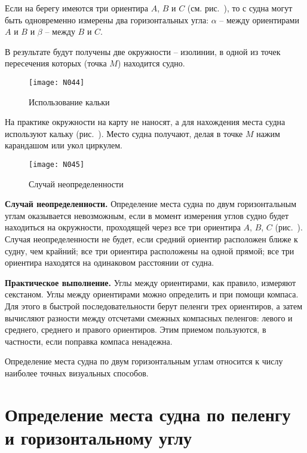 Если на берегу имеются три ориентира $A$, $B$ и $C$
(см. рис.~), то с судна могут быть одновременно измерены два
горизонтальных угла: $\alpha$ \--- между ориентирами $A$ и $B$ и
$\beta$ \--- между $B$ и $C$.

В результате будут получены две окружности \--- изолинии, в одной из
точек пересечения которых (точка $M$) находится судно.

\begin{figure}
  \centering{}
  \texttt{[image: N044]}
  \caption{Использование кальки}
  \label{fig:N44}
\end{figure}

На практике окружности на карту не наносят, а для нахождения места
судна используют кальку (рис.~). Место судна получают, делая
в точке $M$ нажим карандашом или укол циркулем.

\begin{figure}
  \centering{}
  \texttt{[image: N045]}
  \caption{Случай неопределенности}
  \label{fig:N45}
\end{figure}

\textbf{Случай неопределенности.} Определение места судна по двум
горизонтальным углам оказывается невозможным, если в момент измерения
углов судно будет находиться на окружности, проходящей через все три
ориентира $A$, $B$, $C$ (рис.~). Случая неопределенности не
будет, если средний ориентир расположен ближе к судну, чем крайний;
все три ориентира расположены на одной прямой; все три ориентира
находятся на одинаковом расстоянии от судна.

\textbf{Практическое выполнение.} Углы между ориентирами, как правило,
измеряют секстаном. Углы между ориентирами можно определить и при
помощи компаса. Для этого в быстрой последовательности берут пеленги
трех ориентиров, а затем вычисляют разности между отсчетами смежных
компасных пеленгов: левого и среднего, среднего и правого
ориентиров. Этим приемом пользуются, в частности, если поправка
компаса ненадежна.

Определение места судна по двум горизонтальным углам относится к числу
наиболее точных визуальных способов.

\section{Определение места судна по пеленгу и горизонтальному углу}

